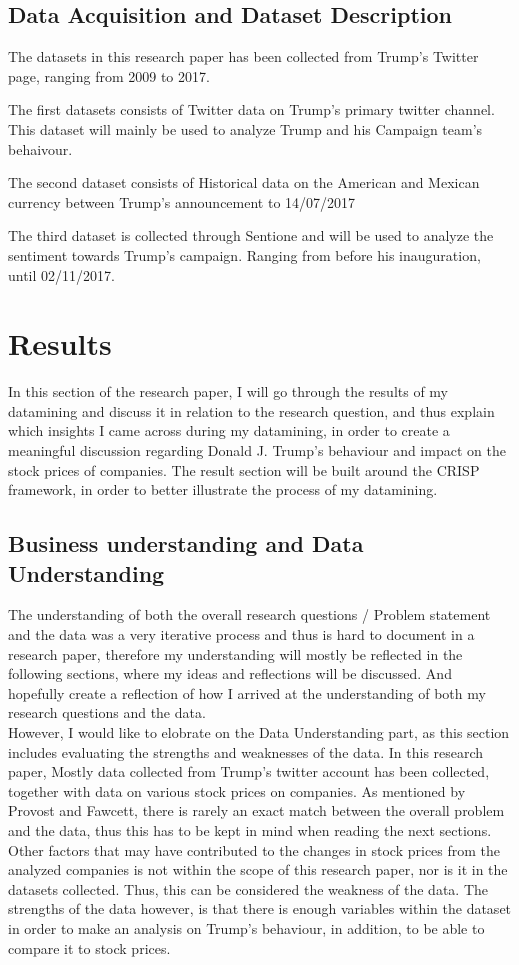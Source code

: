 \documentclass{article}
\begin{document}
\subsection{Data Acquisition and Dataset Description}
The datasets in this research paper has been collected from Trump's Twitter page, ranging from 2009 to 2017.

The first datasets consists of Twitter data on Trump's primary twitter channel.  This dataset will mainly be used to analyze Trump and his Campaign team's behaivour. 

The second dataset consists of Historical data on the American and Mexican currency between Trump's announcement to  14/07/2017

The third dataset is collected through Sentione and will be used to analyze the sentiment towards Trump's campaign. Ranging from before his inauguration, until 02/11/2017. 


\section{Results}
In this section of the research paper, I will go through the results of my datamining and discuss it in relation to the research question, and thus explain which insights I came across during my datamining, in order to create a meaningful discussion regarding Donald J. Trump's behaviour and impact on the stock prices of companies. The result section will be built around the CRISP framework, in order to better illustrate the process of my datamining.

\subsection{Business understanding and Data Understanding}
The understanding of both the overall research questions / Problem statement and the data was a very iterative process and thus is hard to document in a research paper, therefore my understanding will mostly be reflected in the following sections, where my ideas and reflections will be discussed.  And hopefully create a reflection of how I arrived at the understanding of both my research questions and the data. \\

However, I would like to elobrate on the Data Understanding part, as this section includes evaluating the strengths and weaknesses of the data. In this research paper, Mostly data collected from Trump's twitter account has been collected, together with data on various stock prices on companies.  As mentioned by Provost and Fawcett, there is rarely an exact match between the overall problem and the data, thus this has to be kept in mind when reading the next sections. Other factors that may have contributed to the changes in stock prices from the analyzed companies is not within the scope of this research paper, nor is it in the datasets collected. Thus, this can be considered the weakness of the data. The strengths of the data however, is that there is enough variables within the dataset in order to make an analysis on Trump's behaviour, in addition, to be able to compare it to stock prices.
\end{document}
